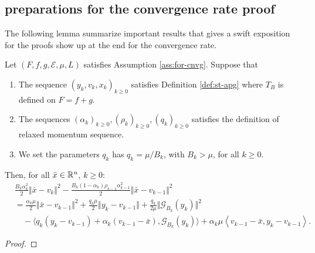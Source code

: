 \documentclass[12pt]{article}
\begin{document}
    \subsection{preparations for the convergence rate proof}
        The following lemma summarize important results that gives a swift exposition for the proofs show up at the end for the convergence rate. 
        \begin{lemma}\label{lemma:cnvg-prep-part1}
            Let $(F, f, g,  \mathcal E, \mu, L)$ satisfies Assumption \ref{ass:for-cnvg}. 
            Suppose that 
            \begin{enumerate}[nosep]
                \item The sequence $(y_k, v_k, x_k)_{k \ge 0}$ satisfies Definition \ref{def:st-apg} where $T_B$ is defined on $F = f + g$. 
                \item The sequences $(\alpha_k)_{k\ge 0}, (\rho_{k})_{k \ge 0}, (q_k)_{k \ge 0}$ satisfies the definition of relaxed momentum sequence.
                \item We set the parameters $q_k$ has $q_k = \mu/B_k$, with $B_k > \mu$, for all $k \ge 0$. 
            \end{enumerate}
            Then, for all $\bar x \in \mathbb R^n$, $k \ge 0$: 
            \begin{align*}
                & \frac{B_k\alpha_k^2}{2}\Vert \bar x - v_k\Vert^2 
                -\frac{B_k(1 - \alpha_k)\rho_{k - 1}\alpha_{k - 1}^2}{2}\Vert \bar x - v_{k - 1}\Vert^2
                \\
                &=
                \frac{\alpha_k \mu}{2}
                \Vert \bar x - v_{k - 1}\Vert^2
                + \frac{q_k\mu}{2}\Vert y_k - v_{k - 1} \Vert
                + \frac{q_k}{2\mu}\Vert \mathcal G_{B_k}(y_k)\Vert^2
                \\ &\quad 
                - \langle
                    q_k(y_k - v_{k - 1}) + \alpha_k(v_{k - 1} - \bar x), \mathcal G_{B_k}(y_k)
                \rangle
                    + \alpha_k \mu
                    \left\langle 
                        v_{k - 1} - \bar x, 
                        y_k - v_{k - 1}
                    \right\rangle. 
            \end{align*}
        \end{lemma}
        \begin{proof}
            
        \end{proof}

        \begin{lemma}\label{lemma:cnvg-prep-part2}
            
        \end{lemma}
        \begin{lemma}\label{lemma:cnvg-prep-part3}
            
        \end{lemma}




\end{document}
